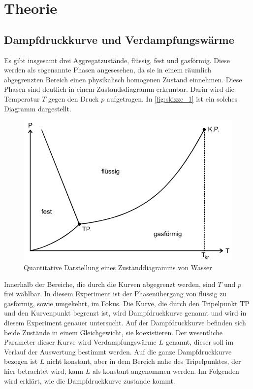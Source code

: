 \section{Theorie}
\label{sec:Theorie}



\subsection{Dampfdruckkurve und Verdampfungswärme}
\label{ssec:a}
Es gibt insgesamt drei Aggregatzustände, flüssig, fest und gasförmig.
Diese werden als sogenannte Phasen angesesehen, da sie in einem räumlich abgegrenzten Bereich einen physikalisch homogenen Zustand einnehmen.
Diese Phasen sind deutlich in einem Zustandsdiagramm erkennbar.
Darin wird die Temperatur $T$ gegen den Druck $p$ aufgetragen.
In \autoref{fig:skizze_1} ist ein solches Diagramm dargestellt.

\begin{figure}
    \centering
    \includegraphics[width=\textwidth/2]{images/bild1.png}
    \caption{Quantitative Darstellung eines Zustanddiagramms von Wasser \cite{V203}}
    \label{fig:skizze_1}
\end{figure}

Innerhalb der Bereiche, die durch die Kurven abgegrenzt werden, sind $T$ und $p$ frei wählbar.
In diesem Experiment ist der Phasenübergang von flüssig zu gasförmig, sowie umgekehrt, im Fokus.
Die Kurve, die durch den Tripelpunkt TP und den Kurvenpunkt begrenzt ist, wird Dampfdruckkurve genannt und wird in diesem Experiment genauer untersucht.
Auf der Dampfdruckkurve befinden sich beide Zustände in einem Gleichgewicht, sie koexistieren.
Der wesentliche Parameter dieser Kurve wird Verdampfungswärme $L$ genannt, dieser soll im Verlauf der Auswertung bestimmt werden.
Auf die ganze Dampfdruckkurve bezogen ist $L$ nicht konstant, aber in dem Bereich nahe des Tripelpunktes, der hier betrachtet wird, kann $L$ als konstant angenommen werden.
Im Folgenden wird erklärt, wie die Dampfdruckkurve zustande kommt.

